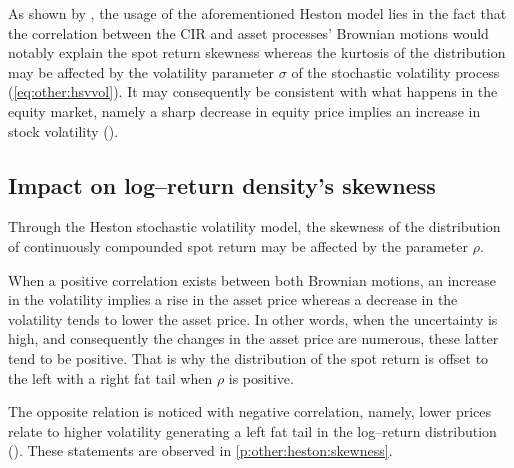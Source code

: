 \documentclass[12pt,a4paper]{report}
\begin{document}
As shown by \citet{heston1993}, the usage of the aforementioned Heston model lies in the fact that the correlation between the CIR and asset processes' Brownian motions would notably explain the spot return skewness whereas the kurtosis of the distribution may be affected by the volatility parameter $\sigma$ of the stochastic volatility process (\cref{eq:other:hsvvol}).
It may consequently be consistent with what happens in the equity market, namely a sharp decrease in equity price implies an increase in stock volatility (\citet{criso2015}).




\subsection{Impact on log--return density's skewness}
\label{sub:hestonskewness}

Through the Heston stochastic volatility model, the skewness of the distribution of continuously compounded spot return may be affected by the parameter $\rho$. 

When a positive correlation exists between both Brownian motions, an increase in the volatility implies a rise in the asset price whereas a decrease in the volatility tends to lower the asset price.
In other words, when the uncertainty is high, and consequently the changes in the asset price are numerous, these latter tend to be positive. 
That is why the distribution of the spot return is offset to the left with a right fat tail when $\rho$ is positive.

The opposite relation is noticed with negative correlation, namely, lower prices relate to higher volatility generating a left fat tail in the log–return distribution (\citet{heston1993}).
These statements are observed in \cref{p:other:heston:skewness}.
\end{document}
